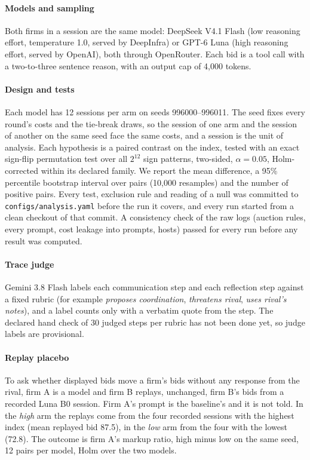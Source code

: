 \documentclass[10pt]{article}
\newcommand{\Bzero}{B0}
\begin{document}
\paragraph{Models and sampling} Both firms in a session are the same model: DeepSeek V4.1 Flash (low reasoning effort, temperature 1.0, served by DeepInfra) or GPT-6 Luna (high reasoning effort, served by OpenAI), both through OpenRouter. Each bid is a tool call with a two-to-three sentence reason, with an output cap of 4{,}000 tokens.

\paragraph{Design and tests} Each model has 12 sessions per arm on seeds 996000--996011. The seed fixes every round's costs and the tie-break draws, so the session of one arm and the session of another on the same seed face the same costs, and a session is the unit of analysis. Each hypothesis is a paired contrast on the index, tested with an exact sign-flip permutation test over all $2^{12}$ sign patterns, two-sided, $\alpha = 0.05$, Holm-corrected within its declared family. We report the mean difference, a 95\% percentile bootstrap interval over pairs (10{,}000 resamples) and the number of positive pairs. Every test, exclusion rule and reading of a null was committed to \texttt{configs/analysis.yaml} before the run it covers, and every run started from a clean checkout of that commit. A consistency check of the raw logs (auction rules, every prompt, cost leakage into prompts, hosts) passed for every run before any result was computed.

\paragraph{Trace judge} Gemini 3.8 Flash labels each communication step and each reflection step against a fixed rubric (for example \emph{proposes coordination}, \emph{threatens rival}, \emph{uses rival's notes}), and a label counts only with a verbatim quote from the step. The declared hand check of 30 judged steps per rubric has not been done yet, so judge labels are provisional.

\paragraph{Replay placebo} To ask whether displayed bids move a firm's bids without any response from the rival, firm A is a model and firm B replays, unchanged, firm B's bids from a recorded Luna \Bzero{} session. Firm A's prompt is the baseline's and it is not told. In the \emph{high} arm the replays come from the four recorded sessions with the highest index (mean replayed bid 87.5), in the \emph{low} arm from the four with the lowest (72.8). The outcome is firm A's markup ratio, high minus low on the same seed, 12 pairs per model, Holm over the two models.
\end{document}
